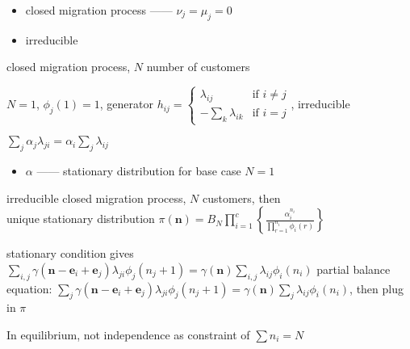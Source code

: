 \begin{itemize}
    \item closed migration process ------ $\nu_j = \mu_j = 0$
    \item irreducible
\end{itemize}

\begin{setting}
    closed migration process, $N$ number of customers
\end{setting}

\begin{example}
    $N = 1$, $\phi_j(1) = 1$, generator $h_{ij} = \begin{cases}
                                                      \lambda_{ij} &\text{if } i \neq j\\
                                                      - \sum_k \lambda_{ik} & \text{if } i = j
    \end{cases}$, irreducible
    \begin{fact}
        $\sum_j \alpha_j\lambda_{ji} = \alpha_i \sum_j \lambda_{ij}$
    \end{fact}
\end{example}

\begin{itemize}
    \item $\alpha$ ------ stationary distribution for base case $N = 1$
\end{itemize}

\begin{thm}
    irreducible closed migration process, $N$ customers, then \\unique stationary distribution
    $\pi(\bm n) = B_N \prod^c_{i = 1} \left\{ \frac{\alpha_i^{n_{i}}}{\prod^{n_i}_{r=1}\phi_i(r)} \right\}$
\end{thm}
\begin{pf}
    stationary condition gives $\sum_{i,j} \gamma(\bm n - \bm e_i + \bm e_j)\lambda_{ji}\phi_j(n_j +1) = \gamma(\bm n)\sum_{i,j}\lambda_{ij} \phi_{i}(n_i)$
    partial balance equation: $\sum_{j} \gamma(\bm n - \bm e_i + \bm e_j)\lambda_{ji}\phi_j(n_j +1) = \gamma(\bm n)\sum_{j}\lambda_{ij} \phi_{i}(n_i)$,
    then plug in $\pi$
\end{pf}

\begin{fact}
    In equilibrium, not independence as constraint of $\sum n_i = N$
\end{fact}

